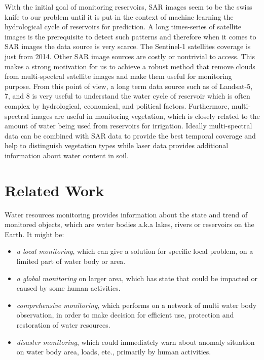 With the initial goal of monitoring reservoirs, SAR images seem to be the swiss knife to our problem until it is put in the context of machine learning the hydrological cycle of reservoirs for prediction. A long times-series of satellite images is the prerequisite to detect such patterns and therefore when it comes to SAR images the data source is very scarce. The Sentinel-1 satellites coverage is just from 2014. Other SAR image sources are costly or nontrivial to access. This makes a strong motivation for us to achieve a robust  method that remove clouds from multi-spectral satellite images and make them useful for monitoring purpose. From this point of view, a long term data source such as of Landsat-5, 7, and 8 is very useful to understand the water cycle of reservoir which is often complex by hydrological, economical, and political factors. Furthermore, multi-spectral images are useful in monitoring vegetation, which is closely related to the amount of water being used from reservoirs for irrigation. Ideally multi-spectral data can be combined with SAR data to provide the best temporal coverage and help to distinguish vegetation types while laser data provides additional information about water content in soil. 


\section{Related Work} %


Water resources monitoring provides information about the state and trend of monitored objects, which are water bodies a.k.a lakes, rivers or reservoirs on the Earth. It might be:

\begin{itemize}
	\item \textit{a local monitoring}, which can give a solution for specific local problem, on a limited part of water body or area.
	\item \textit{a global monitoring} on larger area, which has state that could be impacted or caused by some human activities.
	\item \textit{comprehensive monitoring}, which performs on a network of multi water body observation, in order to make decision for efficient use, protection and restoration of water resources.
	\item \textit{disaster monitoring}, which could immediately warn about anomaly situation on water body area, loads, etc., primarily by human activities.
\end{itemize}

